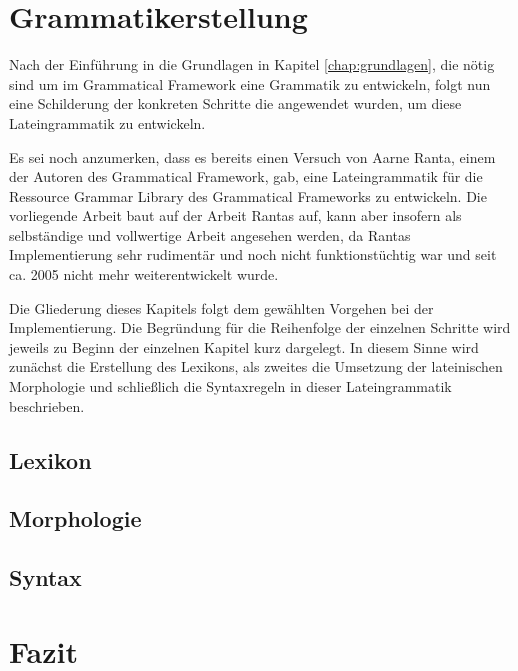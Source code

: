 \documentclass[fontsize=12pt,abstract=on,titlepage,bibliography=totoc,ngerman,listof=totoc]{scrreprt}
\begin{document}
\chapter{Grammatikerstellung}
\label{chap:grammatik}
Nach der Einführung in die Grundlagen in Kapitel \ref{chap:grundlagen}, die nötig sind um im Grammatical Framework eine Grammatik zu entwickeln, folgt nun eine Schilderung der konkreten Schritte die angewendet wurden, um diese Lateingrammatik zu entwickeln. \par
Es sei noch anzumerken, dass es bereits einen Versuch von Aarne Ranta, einem der Autoren des Grammatical Framework, gab, eine Lateingrammatik für die Ressource Grammar Library des Grammatical Frameworks zu entwickeln. Die vorliegende Arbeit baut auf der Arbeit Rantas auf, kann aber insofern als selbständige und vollwertige Arbeit angesehen werden, da Rantas Implementierung sehr rudimentär und noch nicht funktionstüchtig war und seit ca. 2005 nicht mehr weiterentwickelt wurde. \par
Die Gliederung dieses Kapitels folgt dem gewählten Vorgehen bei der Implementierung. Die Begründung für die Reihenfolge der einzelnen Schritte wird jeweils zu Beginn der einzelnen Kapitel kurz dargelegt. In diesem Sinne wird zunächst die Erstellung des Lexikons, als zweites die Umsetzung der lateinischen Morphologie und schließlich die Syntaxregeln in dieser Lateingrammatik beschrieben.
\pagebreak
\section{Lexikon}
\label{sec:lexikon}

\FloatBarrier
\pagebreak
\section{Morphologie}
\label{sec:morpho}

\FloatBarrier
\pagebreak
\section{Syntax}
\label{sec:syntax}

\FloatBarrier
\pagebreak
\chapter{Fazit}
\label{chap:fazit}

\FloatBarrier
\pagebreak
\clearpage
{}
\setcounter{page}{1}
%
\printbibliography
\pagebreak
\end{document}
